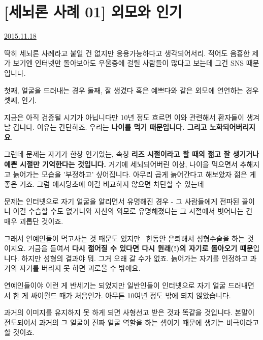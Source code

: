 \section{[세뇌론 사례 01] 외모와 인기}
\href{https://www.kockoc.com/Apoc/499377}{2015.11.18}

\vspace{5mm}

딱히 세뇌론 사례라고 붙일 건 없지만 응용가능하다고 생각되어서리.
적어도 음흉한 제가 보기엔 인터넷만 돌아보아도 우울증에 걸릴 사람들이 많다고 보는데
그건 SNS 때문입니다.
\vspace{5mm}

첫째, 얼굴을 드러내는 경우
둘째, 잘 생겼다 혹은 예쁘다와 같은 외모에 연연하는 경우
셋째, 인기.
\vspace{5mm}

지금은 아직 검증될 시기가 아닙니다만 10년 정도 흐르면 이와 관련해서 환자들이 생겨날 겁니다.
이유는 간단하죠. 우리는 \textbf{나이를 먹기 때문입니다. 그리고 노화되어버리지요}.
\vspace{5mm}

그런데 문제는 자기가 한창 인기있는, 속칭 \textbf{리즈 시절이라고 할 때의 젊고 잘 생기거나 예쁜 시절만 기억한다는 것입니다.}
거기에 세뇌되어버린 이상, 나이을 먹으면서 추해지고 늙어가는 모습을 '부정하고' 싶어집니다.
아무리 곱게 늙어간다고 해보았자 젊은 게 좋은 거죠.
그럼 애시당초에 이걸 비교하지 않으면 차단할 수 있는데
\vspace{5mm}

문제는 인터넷으로 자기 얼굴을 알리면서 유명해진 경우 - 그 사람들에게 전파된 꼴이니 이걸 수습할 수도 없거니와
자신의 외모로 유명해졌다는 그 시절에서 벗어나는 건 매우 괴롭단 것이죠.
\vspace{5mm}

그래서 연예인들이 먹고사는 것 때문도 있지만  한동안 은퇴해서 성형수술을 하는 것이지요.
거금을 들여서 \textbf{다시 젊어질 수 있다면 다시 원래(!)의 자기로 돌아오기 때문}입니다.
하지만 성형의 결과야 뭐. 그거 오래 갈 수가 없죠. 늙어가는 자기를 인정하고 과거의 자기를 버리지 못 하면 괴로울 수 밖에요.
\vspace{5mm}

연예인들이야 이런 게 반세기는 되었지만
일반인들이 인터넷으로 자기 얼굴 드러내면서 한 게 싸이월드 때가 처음인가. 아무튼 10여년 정도 밖에 되지 않았습니다.
\vspace{5mm}

과거의 이미지를 유지하지 못 하게 되면 사형선고 받은 것과 똑같을 것입니다.
본말이 전도되어서 과거의 그 얼굴이 진짜 얼굴 역할을 하는 셈이기 때문에 생기는 비극이라고 할 것이죠.
\vspace{5mm}

